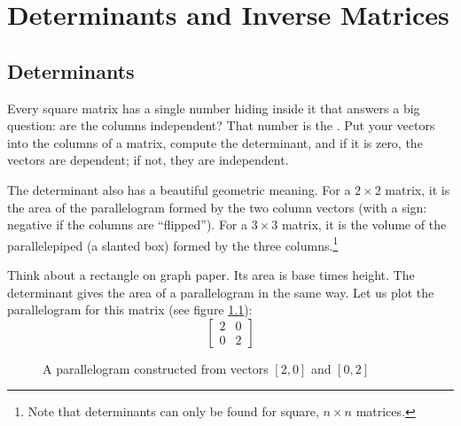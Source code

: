 \chapter{Determinants and Inverse Matrices}\label{chap:det_inv}

\section{Determinants}

Every square matrix has a single number hiding inside it that answers a big
question: are the columns independent? That number is the
. Put your vectors into the columns of a matrix, compute
the determinant, and if it is zero, the vectors are dependent; if not, they
are independent.

The determinant also has a beautiful geometric meaning. For a $2 \times 2$
matrix, it is the area of the parallelogram
formed by the two column vectors (with a sign: negative if the columns are
``flipped''). For a $3 \times 3$ matrix, it is the volume of the
parallelepiped (a slanted box) formed by the three columns.\footnote{Note that determinants can only be found for square, $n \times n$ matrices.} 

Think about a rectangle on graph paper. Its area is base times height. The determinant gives the area of a parallelogram in the same way. Let us plot the parallelogram for this matrix (see figure \ref{fig:twos}):
$$
\begin{bmatrix}
2 & 0  \\
0 & 2 
\end{bmatrix}
$$

\begin{figure}[H]
    \centering
    \caption{A parallelogram constructed from vectors $\left[2, 0 \right]$ and 
    $\left[0, 2 \right]$}
    \label{fig:twos}
\end{figure}
 
